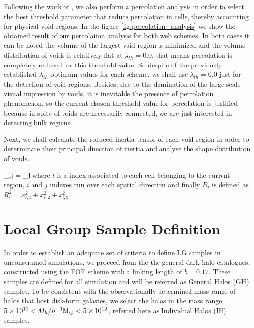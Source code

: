 \documentclass[usenatbib]{latex/mn2e}
\begin{document}
Following the work of , we also perform a 
percolation analysis in order to select the best threshold parameter that
reduce percolation in cells, thereby accounting for physical void regions.
In the figure \ref{fig:percolation_analysis} we show the obtained result 
of our percolation analysis for both web schemes. In both cases it can be 
noted the volume of the largest void region is minimized and the volume 
distribution of voids is relatively flat at $\lambda_{th} = 0.0$, that 
means percolation is completely reduced for this threshold value. So 
despite of the previously established $\lambda_{th}$ optimum values for 
each scheme, we shall use $\lambda_{th} = 0.0$ just for the detection of 
void regions. Besides, due to the domination of the large scale visual 
impression by voids, it is inevitable the presence of percolation 
phenomenon, so the current chosen threshold value for percolation is 
justified because in spite of voids are necessarily connected, we are just 
interested in detecting bulk regions.



Next, we shall calculate the reduced inertia tensor of each void region 
in order to determinate their principal direction of inertia and analyse 
the shape distribution of voids.


{ \tau_{ij} = \sum_l  }
where $l$ is a index associated to each cell belonging to the current 
region, $i$ and $j$ indexes run over each spatial direction and finally 
$R_l$ is defined as $R_l^2 = x_{l,1}^2 + x_{l,2}^2 + x_{l,3}^2$.




\section{Local Group Sample Definition}
\label{section:Def_Samples}



In order to establish an adequate set of criteria to define LG samples in 
unconstrained simulations, we proceed from the the general dark halo 
catalogues, constructed using the FOF scheme with a linking length of 
$b=0.17$. These samples are defined for all simulation and will be 
referred as General Halos (GH) samples. To be consistent with the 
observationally determined mass range of halos that host disk-form 
galaxies, we select the halos in the mass range $5\times10^{11} <
M_{h}/\hMsun < 5\times 10^{12}$, referred here as Individual Halos (IH) 
samples. 
\end{document}

